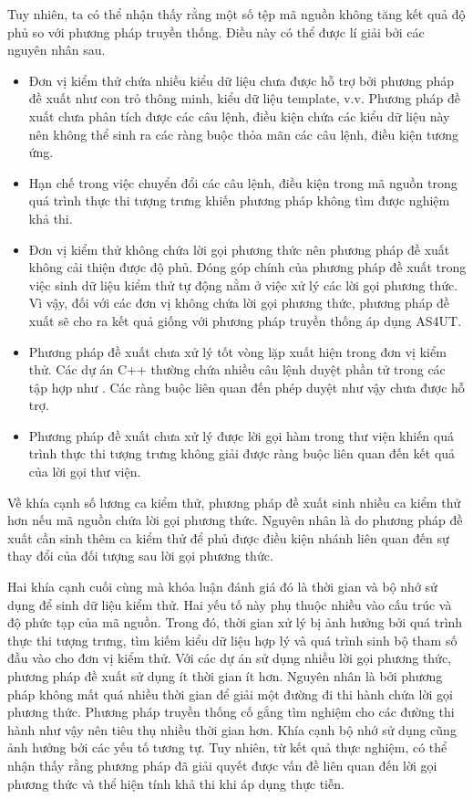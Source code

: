 Tuy nhiên, ta có thể nhận thấy rằng một số tệp mã nguồn không tăng kết quả độ phủ so với phương pháp truyền thống. Điều này có thể được lí giải bởi các nguyên nhân sau.
\begin{itemize}
    \item Đơn vị kiểm thử chứa nhiều kiểu dữ liệu chưa được hỗ trợ bởi phương pháp đề xuất như con trỏ thông minh, kiểu dữ liệu template, v.v. Phương pháp đề xuất chưa phân tích được các câu lệnh, điều kiện chứa các kiểu dữ liệu này nên không thể sinh ra các ràng buộc thỏa mãn các câu lệnh, điều kiện tương ứng.
    
    \item Hạn chế trong việc chuyển đổi các câu lệnh, điều kiện trong mã nguồn trong quá trình thực thi tượng trưng khiến phương pháp không tìm được nghiệm khả thi.
    
    \item Đơn vị kiểm thử không chứa lời gọi phương thức nên phương pháp đề xuất không cải thiện được độ phủ. Đóng góp chính của phương pháp đề xuất trong việc sinh dữ liệu kiểm thử tự động nằm ở việc xử lý các lời gọi phương thức. Vì vậy, đối với các đơn vị không chứa lời gọi phương thức, phương pháp đề xuất sẽ cho ra kết quả giống với phương pháp truyền thống áp dụng AS4UT.
    
    \item Phương pháp đề xuất chưa xử lý tốt vòng lặp xuất hiện trong đơn vị kiểm thử. Các dự án C++ thường chứa nhiều câu lệnh duyệt phần tử trong các tập hợp như . Các ràng buộc liên quan đến phép duyệt như vậy chưa được hỗ trợ.
    
    \item Phương pháp đề xuất chưa xử lý được lời gọi hàm trong thư viện khiến quá trình thực thi tượng trưng không giải được ràng buộc liên quan đến kết quả của lời gọi thư viện.
\end{itemize}

Về khía cạnh số lương ca kiểm thử, phương pháp đề xuất sinh nhiều ca kiểm thử hơn nếu mã nguồn chứa lời gọi phương thức. Nguyên nhân là do phương pháp đề xuất cần sinh thêm ca kiểm thử để phủ được điều kiện nhánh liên quan đến sự thay đổi của đối tượng sau lời gọi phương thức.

Hai khía cạnh cuối cùng mà khóa luận đánh giá đó là thời gian và bộ nhớ sử dụng để sinh dữ liệu kiểm thử. Hai yếu tố này phụ thuộc nhiều vào cấu trúc và độ phức tạp của mã nguồn. Trong đó, thời gian xử lý bị ảnh hưởng bởi quá trình thực thi tượng trưng, tìm kiếm kiểu dữ liệu hợp lý và quá trình sinh bộ tham số đầu vào cho đơn vị kiểm thử. Với các dự án sử dụng nhiều lời gọi phương thức, phương pháp đề xuất sử dụng ít thời gian ít hơn. Nguyên nhân là bởi phương pháp không mất quá nhiều thời gian để giải một đường đi thi hành chứa lời gọi phương thức. Phương pháp truyền thống cố gắng tìm nghiệm cho các đường thi hành như vậy nên tiêu thụ nhiều thời gian hơn. Khía cạnh bộ nhớ sử dụng cũng ảnh hưởng bởi các yếu tố tương tự. Tuy nhiên, từ kết quả thực nghiệm, có thể nhận thấy rằng phương pháp đã giải quyết được vấn đề liên quan đến lời gọi phương thức và thể hiện tính khả thi khi áp dụng thực tiễn.
